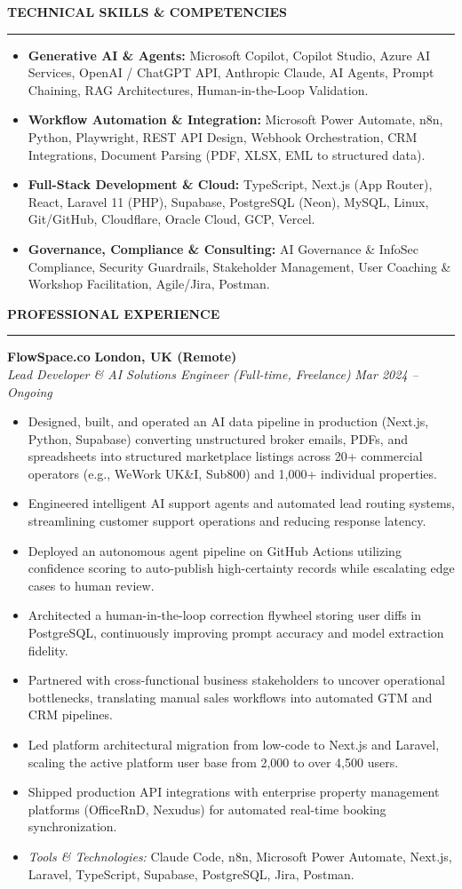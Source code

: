\documentclass[10pt,a4paper]{article}
\newcommand{\cvsection}[1]{%
  \vspace{6pt}%
  {\large\bfseries\MakeUppercase{#1}}%
  \vspace{2pt}%
  \hrule%
  \vspace{4pt}%
}
\newcommand{\cvexperience}[4]{%
  \noindent\textbf{#1} \hfill \textbf{#2}\\%
  \noindent\textit{#3} \hfill \textit{#4}%
  \vspace{2pt}%
}
\begin{document}
\cvsection{Technical Skills \& Competencies}
\begin{itemize}[leftmargin=*, noitemsep, topsep=1pt]
  \item \textbf{Generative AI \& Agents:} Microsoft Copilot, Copilot Studio, Azure AI Services, OpenAI / ChatGPT API, Anthropic Claude, AI Agents, Prompt Chaining, RAG Architectures, Human-in-the-Loop Validation.
  \item \textbf{Workflow Automation \& Integration:} Microsoft Power Automate, n8n, Python, Playwright, REST API Design, Webhook Orchestration, CRM Integrations, Document Parsing (PDF, XLSX, EML to structured data).
  \item \textbf{Full-Stack Development \& Cloud:} TypeScript, Next.js (App Router), React, Laravel 11 (PHP), Supabase, PostgreSQL (Neon), MySQL, Linux, Git/GitHub, Cloudflare, Oracle Cloud, GCP, Vercel.
  \item \textbf{Governance, Compliance \& Consulting:} AI Governance \& InfoSec Compliance, Security Guardrails, Stakeholder Management, User Coaching \& Workshop Facilitation, Agile/Jira, Postman.
\end{itemize}

\cvsection{Professional Experience}

\cvexperience{FlowSpace.co}{London, UK (Remote)}{Lead Developer \& AI Solutions Engineer (Full-time, Freelance)}{Mar 2024 -- Ongoing}
\begin{itemize}[leftmargin=*, noitemsep, topsep=2pt, parsep=1pt]
  \item Designed, built, and operated an AI data pipeline in production (Next.js, Python, Supabase) converting unstructured broker emails, PDFs, and spreadsheets into structured marketplace listings across 20+ commercial operators (e.g., WeWork UK\&I, Sub800) and 1,000+ individual properties.
  \item Engineered intelligent AI support agents and automated lead routing systems, streamlining customer support operations and reducing response latency.
  \item Deployed an autonomous agent pipeline on GitHub Actions utilizing confidence scoring to auto-publish high-certainty records while escalating edge cases to human review.
  \item Architected a human-in-the-loop correction flywheel storing user diffs in PostgreSQL, continuously improving prompt accuracy and model extraction fidelity.
  \item Partnered with cross-functional business stakeholders to uncover operational bottlenecks, translating manual sales workflows into automated GTM and CRM pipelines.
  \item Led platform architectural migration from low-code to Next.js and Laravel, scaling the active platform user base from 2,000 to over 4,500 users.
  \item Shipped production API integrations with enterprise property management platforms (OfficeRnD, Nexudus) for automated real-time booking synchronization.
  \item \textit{Tools \& Technologies:} Claude Code, n8n, Microsoft Power Automate, Next.js, Laravel, TypeScript, Supabase, PostgreSQL, Jira, Postman.
\end{itemize}
\end{document}
